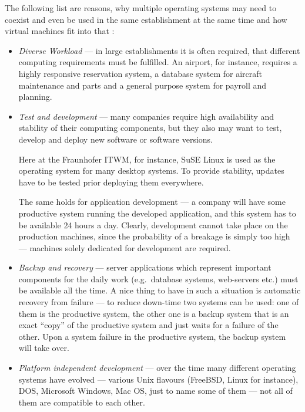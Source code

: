 \bigskip

The following list are reasons, why multiple operating systems may need to
coexist and  even be used in the  same establishment at the  same time and
how virtual machines fit into that \cite{borden89,virtualization-overview}:

\begin{itemize}
\item  \emph{Diverse Workload}  --- in  large establishments  it  is often
  required, that  different computing  requirements must be  fulfilled. An
  airport, for instance, requires  a highly responsive reservation system,
  a  database system  for aircraft  maintenance  and parts  and a  general
  purpose system for payroll and planning.
\item  \emph{Test  and  development}   ---  many  companies  require  high
  availability and stability of  their computing components, but they also
  may want to test, develop  and deploy new software or software versions.
  
  Here at  the Fraunhofer ITWM,  for instance, SuSE  Linux is used  as the
  operating system for many desktop systems. To provide stability, updates
  have to be tested prior deploying them everywhere.

  The same holds for application  development --- a company will have some
  productive system running the developed application, and this system has
  to be available  24 hours a day. Clearly,  development cannot take place
  on  the production  machines, since  the  probability of  a breakage  is
  simply  too  high ---  machines  solely  dedicated  for development  are
  required.
\item \emph{Backup  and recovery} --- server  applications which represent
  important  components   for  the  daily   work  (e.g.~database  systems,
  web-servers etc.) must  be available all the time. A  nice thing to have
  in such  a situation  is automatic recovery  from failure ---  to reduce
  down-time two systems can be used: one of them is the productive system,
  the  other one  is a  backup system  that is  an exact  ``copy''  of the
  productive system  and just waits  for a failure  of the other.   Upon a
  system failure  in the  productive system, the  backup system  will take
  over.
\item  \emph{Platform  independent development}  ---  over  the time  many
  different  operating  systems have  evolved  ---  various Unix  flavours
  (FreeBSD, Linux for  instance), DOS, Microsoft Windows, Mac  OS, just to
  name some of them --- not all of them are compatible to each other.


\end{itemize}
